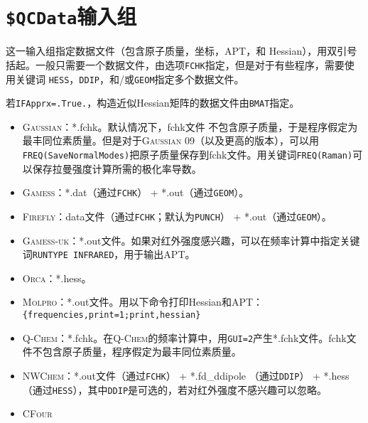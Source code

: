 \documentclass[12pt,a4paper,openany,twoside,cap,UTF8]{ctexbook}
\begin{document}

\section{\texttt{\$QCData}输入组} \label{sec:inp-qcdata}

这一输入组指定数据文件（包含原子质量，坐标，APT，和 Hessian），用双引号括起。一般只需要一个数据文件，由选项\verb|FCHK|指定，但是对于有些程序，需要使用关键词
\verb|HESS|，\verb|DDIP|，和/或\verb|GEOM|指定多个数据文件。

若\verb|IFApprx=.True.|，构造近似Hessian矩阵的数据文件由\verb|BMAT|指定。

\begin{itemize}
\item \textsc{Gaussian}：*.fchk。默认情况下，fchk文件 不包含原子质量，于是程序假定为最丰同位素质量。但是对于\textsc{Gaussian} 09（以及更高的版本），可以用\texttt{FREQ(SaveNormalModes)}把原子质量保存到fchk文件。用关键词\texttt{FREQ(Raman)}可以保存拉曼强度计算所需的极化率导数。
\item \textsc{Gamess}：*.dat（通过\verb|FCHK|） + *.out（通过\verb|GEOM|）。
\item \textsc{Firefly}：data文件（通过\verb|FCHK|；默认为\verb|PUNCH|） + *.out（通过\verb|GEOM|）。
\item \textsc{Gamess-uk}：*.out文件。如果对红外强度感兴趣，可以在频率计算中指定关键词\texttt{RUNTYPE INFRARED}，用于输出APT。
\item \textsc{Orca}：*.hess。
\item \textsc{Molpro}：*.out文件。用以下命令打印Hessian和APT： \\
\verb|{frequencies,print=1;print,hessian}|
\item \textsc{Q-Chem}：*.fchk。在\textsc{Q-Chem}的频率计算中，用\texttt{GUI=2}产生*.fchk文件。fchk文件不包含原子质量，程序假定为最丰同位素质量。
\item \textsc{NWChem}：*.out文件（通过\verb|FCHK|） + *.fd{\_}ddipole （通过\verb|DDIP|） +
*.hess （通过\verb|HESS|），其中\verb|DDIP|是可选的，若对红外强度不感兴趣可以忽略。
\item \textsc{CFour}
\end{itemize}
\end{document}
